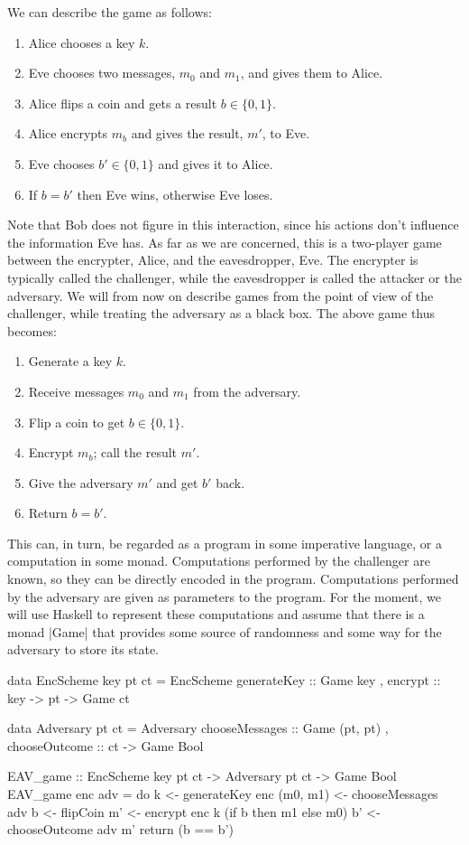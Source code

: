 We can describe the game as follows:
\begin{enumerate}
    \itemsep0em
    \item Alice chooses a key $k$.
    \item Eve chooses two messages, $m_0$ and $m_1$, and gives them to Alice.
    \item Alice flips a coin and gets a result $b \in \{0, 1\}$.
    \item Alice encrypts $m_b$ and gives the result, $m'$, to Eve.
    \item Eve chooses $b' \in \{0, 1\}$ and gives it to Alice.
    \item If $b = b'$ then Eve wins, otherwise Eve loses.
\end{enumerate}

Note that Bob does not figure in this interaction, since his actions don't influence the information Eve has.  As far as
we are concerned, this is a two-player game between the encrypter, Alice, and the eavesdropper, Eve.  The encrypter is
typically called the challenger, while the eavesdropper is called the attacker or the adversary.  We will from now on
describe games from the point of view of the challenger, while treating the adversary as a black box.  The above game
thus becomes:
\begin{enumerate}
    \itemsep0em
    \item Generate a key $k$.
    \item Receive messages $m_0$ and $m_1$ from the adversary.
    \item Flip a coin to get $b \in \{0, 1\}$.
    \item Encrypt $m_b$; call the result $m'$.
    \item Give the adversary $m'$ and get $b'$ back.
    \item Return $b = b'$.
\end{enumerate}

This can, in turn, be regarded as a program in some imperative language, or a computation in some monad.  Computations
performed by the challenger are known, so they can be directly encoded in the program.  Computations performed by the
adversary are given as parameters to the program.  For the moment, we will use Haskell to represent these computations
and assume that there is a monad |Game| that provides some source of randomness and some way for the adversary to
store its state.
\begin{code}
data EncScheme key pt ct = EncScheme
                         { generateKey :: Game key
                         , encrypt :: key -> pt -> Game ct
                         }

data Adversary pt ct = Adversary
                     { chooseMessages :: Game (pt, pt)
                     , chooseOutcome :: ct -> Game Bool
                     }

EAV_game :: EncScheme key pt ct -> Adversary pt ct -> Game Bool
EAV_game enc adv = do
    k <- generateKey enc
    (m0, m1) <- chooseMessages adv
    b <- flipCoin
    m' <- encrypt enc k (if b then m1 else m0)
    b' <- chooseOutcome adv m'
    return (b == b')
\end{code}

